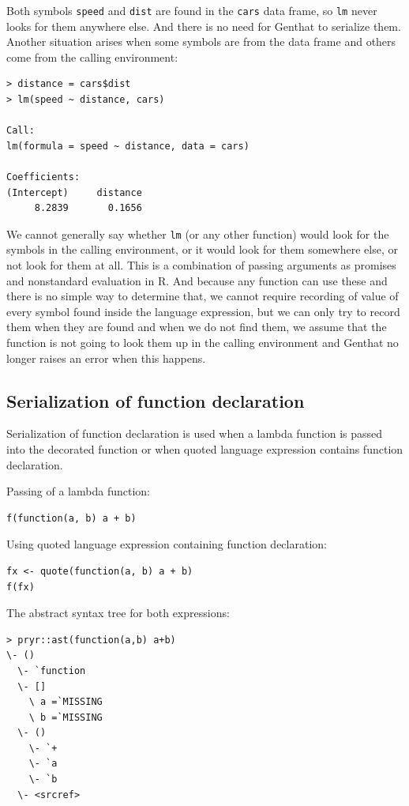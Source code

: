 \documentclass[thesis=B,english]{FITthesis}[2012/10/20]
\begin{document}
Both symbols \verb|speed| and \verb|dist| are found in the \verb|cars| data frame, so \verb|lm| never looks for them anywhere else. And there is no need for Genthat to serialize them. Another situation arises when some symbols are from the data frame and others come from the calling environment:

\begin{verbatim}
> distance = cars$dist
> lm(speed ~ distance, cars)

Call:
lm(formula = speed ~ distance, data = cars)

Coefficients:
(Intercept)     distance
     8.2839       0.1656
\end{verbatim}

We cannot generally say whether \verb|lm| (or any other function) would look for the symbols in the calling environment, or it would look for them somewhere else, or not look for them at all. This is a combination of passing arguments as promises and nonstandard evaluation in R. And because any function can use these and there is no simple way to determine that, we cannot require recording of value of every symbol found inside the language expression, but we can only try to record them when they are found and when we do not find them, we assume that the function is not going to look them up in the calling environment and Genthat no longer raises an error when this happens. 

\subsection{Serialization of function declaration}
Serialization of function declaration is used when a lambda function is passed into the decorated function or when quoted language expression contains function declaration.

Passing of a lambda function:

\begin{verbatim}
f(function(a, b) a + b)
\end{verbatim}

Using quoted language expression containing function declaration:

\begin{verbatim}
fx <- quote(function(a, b) a + b)
f(fx)
\end{verbatim}

The abstract syntax tree for both expressions:

\begin{verbatim}
> pryr::ast(function(a,b) a+b)
\- ()
  \- `function
  \- []
    \ a =`MISSING
    \ b =`MISSING
  \- ()
    \- `+
    \- `a
    \- `b
  \- <srcref> 
\end{verbatim}
\end{document}

